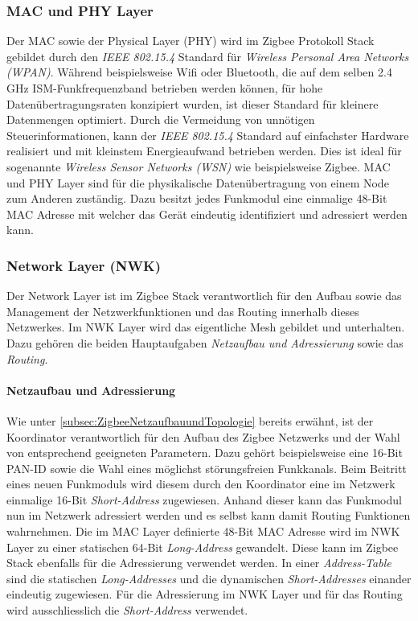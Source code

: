 \subsubsection{MAC und PHY Layer}\label{subsubsec:MACundPHYLayer}
Der MAC sowie der Physical Layer (PHY) wird im Zigbee Protokoll Stack gebildet durch den \textit{IEEE 802.15.4} Standard für \textit{Wireless Personal Area Networks (WPAN)}.
Während beispielsweise Wifi oder Bluetooth, die auf dem selben 2.4 GHz ISM-Funkfrequenzband betrieben werden können, für hohe Datenübertragungsraten konzipiert wurden, ist dieser Standard für kleinere Datenmengen optimiert.
Durch die Vermeidung von unnötigen Steuerinformationen, kann der \textit{IEEE 802.15.4} Standard auf einfachster Hardware realisiert und mit kleinstem Energieaufwand betrieben werden.
Dies ist ideal für sogenannte \textit{Wireless Sensor Networks (WSN)} wie beispielsweise Zigbee.
MAC und PHY Layer sind für die physikalische Datenübertragung von einem Node zum Anderen zuständig.
Dazu besitzt jedes Funkmodul eine einmalige 48-Bit MAC Adresse mit welcher das Gerät eindeutig identifiziert und adressiert werden kann. \cite{markus_krause_rainer_konrad_ieee_2014}


\subsubsection{Network Layer (NWK)}\label{subsubsec:Network Layer}
Der Network Layer ist im Zigbee Stack verantwortlich für den Aufbau sowie das Management der Netzwerkfunktionen und das Routing innerhalb dieses Netzwerkes.
Im NWK Layer wird das eigentliche Mesh gebildet und unterhalten. Dazu gehören die beiden Hauptaufgaben \textit{Netzaufbau und Adressierung} sowie das \textit{Routing}.

\paragraph{Netzaufbau und Adressierung}
Wie unter \ref{subsec:ZigbeeNetzaufbauundTopologie} bereits erwähnt, ist der Koordinator verantwortlich für den Aufbau des Zigbee Netzwerks und der Wahl von entsprechend geeigneten Parametern.
Dazu gehört beispielsweise eine 16-Bit PAN-ID sowie die Wahl eines möglichst störungsfreien Funkkanals.
Beim Beitritt eines neuen Funkmoduls wird diesem durch den Koordinator eine im Netzwerk einmalige 16-Bit \textit{Short-Address} zugewiesen.
Anhand dieser kann das Funkmodul nun im Netzwerk adressiert werden und es selbst kann damit Routing Funktionen wahrnehmen.
Die im MAC Layer definierte 48-Bit MAC Adresse wird im NWK Layer zu einer statischen 64-Bit \textit{Long-Address} gewandelt.
Diese kann im Zigbee Stack ebenfalls für die Adressierung verwendet werden.
In einer \textit{Address-Table} sind die statischen \textit{Long-Addresses} und die dynamischen \textit{Short-Addresses} einander eindeutig zugewiesen.
Für die Adressierung im NWK Layer und für das Routing wird ausschliesslich die \textit{Short-Address} verwendet.

